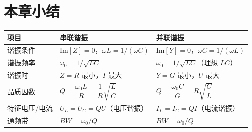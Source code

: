 \section*{本章小结}
\begin{center}
\begin{tabular}{@{}p{}p{}p{}@{}}
\toprule
项目 & 串联谐振 & 并联谐振 \\
\midrule
谐振条件 & $\mathrm{Im}[Z]=0$，$\omega L=1/(\omega C)$ & $\mathrm{Im}[Y]=0$，$\omega C=1/(\omega L)$ \\
谐振频率 & $\omega_0=1/\sqrt{LC}$ & $\omega_0=1/\sqrt{LC}$（理想 $LC$）\\
谐振时 & $Z=R$ 最小，$I$ 最大 & $Y=G$ 最小，$U$ 最大 \\
品质因数 & $Q=\dfrac{\omega_0L}{R}=\dfrac{1}{R}\sqrt{\dfrac{L}{C}}$ & $Q=\dfrac{\omega_0C}{G}=R\sqrt{\dfrac{C}{L}}$ \\
特征电压/电流 & $U_L=U_C=QU$（电压谐振）& $I_L=I_C=QI$（电流谐振）\\
通频带 & $BW=\omega_0/Q$ & $BW=\omega_0/Q$ \\
\bottomrule
\end{tabular}
\end{center}

\endinput
